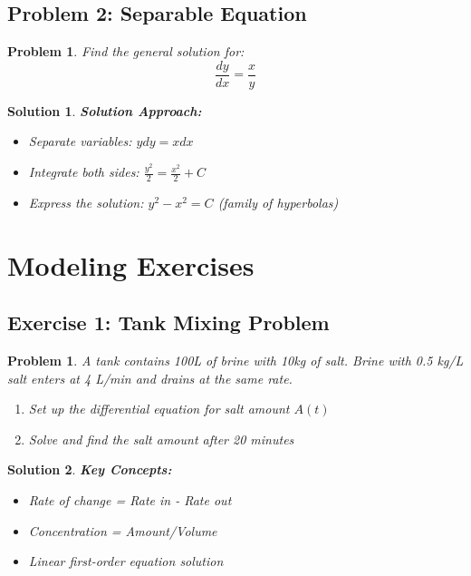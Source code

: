 \documentclass[12pt, letterpaper]{book}
\newcounter{problemcounter}[chapter]
\theoremstyle{problemstyle}
\newtheorem{problem}[problemcounter]{Problem}
\theoremstyle{solutionstyle}
\newtheorem*{solution}{Solution}
\begin{document}
\subsection{Problem 2: Separable Equation}

\begin{problem}
Find the general solution for:
$$\frac{dy}{dx} = \frac{x}{y}$$
\end{problem}

\begin{solution}
\textbf{Solution Approach:}
\begin{itemize}
    \item Separate variables: $y dy = x dx$
    \item Integrate both sides: $\frac{y^2}{2} = \frac{x^2}{2} + C$
    \item Express the solution: $y^2 - x^2 = C$ (family of hyperbolas)
\end{itemize}
\end{solution}

\section{Modeling Exercises}

\subsection{Exercise 1: Tank Mixing Problem}

\begin{problem}
A tank contains 100L of brine with 10kg of salt. Brine with 0.5 kg/L salt enters at 4 L/min and drains at the same rate.
\begin{enumerate}
    \item Set up the differential equation for salt amount $A(t)$
    \item Solve and find the salt amount after 20 minutes
\end{enumerate}
\end{problem}

\begin{solution}
\textbf{Key Concepts:}
\begin{itemize}
    \item Rate of change = Rate in - Rate out
    \item Concentration = Amount/Volume
    \item Linear first-order equation solution
\end{itemize}
\end{solution}
\end{document}

